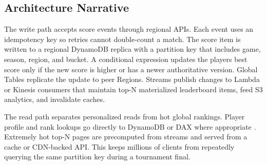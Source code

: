 \subsection{Architecture Narrative}
The write path accepts score events through regional APIs. Each event uses an idempotency key so retries cannot double-count a match. The score item is written to a regional DynamoDB replica with a partition key that includes game, season, region, and bucket. A conditional expression updates the player\textquotesingle{}s best score only if the new score is higher or has a newer authoritative version. Global Tables replicate the update to peer Regions. Streams publish changes to Lambda or Kinesis consumers that maintain top-N materialized leaderboard items, feed S3 analytics, and invalidate caches.

The read path separates personalized reads from hot global rankings. Player profile and rank lookups go directly to DynamoDB or DAX where appropriate \cite{awsDynamoDBDAX}. Extremely hot top-N pages are precomputed from streams and served from a cache or CDN-backed API. This keeps millions of clients from repeatedly querying the same partition key during a tournament final.

